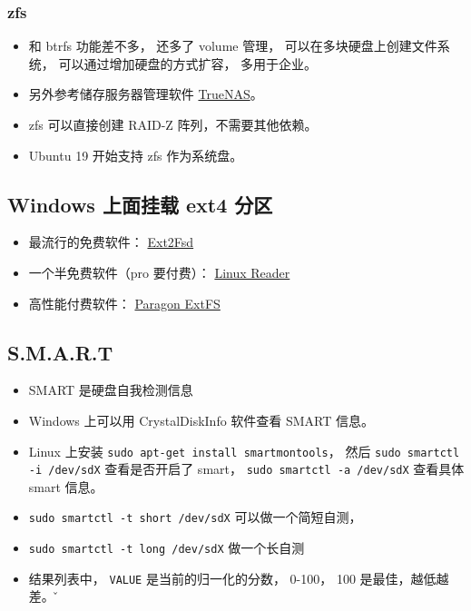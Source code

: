 \subsubsection{zfs}
\begin{itemize}
\item 和 btrfs 功能差不多， 还多了 volume 管理， 可以在多块硬盘上创建文件系统， 可以通过增加硬盘的方式扩容， 多用于企业。
\item 另外参考储存服务器管理软件 \href{https://www.truenas.com/truenas-core/}{TrueNAS}。
\item zfs 可以直接创建 RAID-Z 阵列，不需要其他依赖。
\item Ubuntu 19 开始支持 zfs 作为系统盘。
\end{itemize}


\subsection{Windows 上面挂载 ext4 分区}
\begin{itemize}
\item 最流行的免费软件： \href{https://sourceforge.net/projects/ext2fsd/}{Ext2Fsd}
\item 一个半免费软件（pro 要付费）： \href{https://www.diskinternals.com/linux-reader/}{Linux Reader}
\item 高性能付费软件： \href{https://www.paragon-software.com/business/extfs-for-windows/}{Paragon ExtFS}
\end{itemize}

\subsection{S.M.A.R.T}
\begin{itemize}
\item SMART 是硬盘自我检测信息
\item Windows 上可以用 CrystalDiskInfo 软件查看 SMART 信息。
\item Linux 上安装 \verb`sudo apt-get install smartmontools`， 然后 \verb`sudo smartctl -i /dev/sdX` 查看是否开启了 smart， \verb`sudo smartctl -a /dev/sdX` 查看具体 smart 信息。
\item \verb`sudo smartctl -t short /dev/sdX` 可以做一个简短自测，
\item \verb`sudo smartctl -t long /dev/sdX` 做一个长自测
\item 结果列表中， \verb`VALUE` 是当前的归一化的分数， 0-100， 100 是最佳，越低越差。 \v
\end{itemize}


